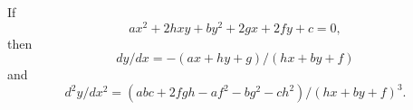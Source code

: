 If
\[
ax^{2} + 2hxy + by^{2} + 2gx + 2fy + c = 0,
\]
then
\[
dy/dx = -(ax + hy + g)/(hx + by + f)
\]
and
\[
d^{2}y/dx^{2} = (abc + 2fgh - af^{2} - bg^{2} - ch^{2})/(hx + by + f)^{3}.
\]

